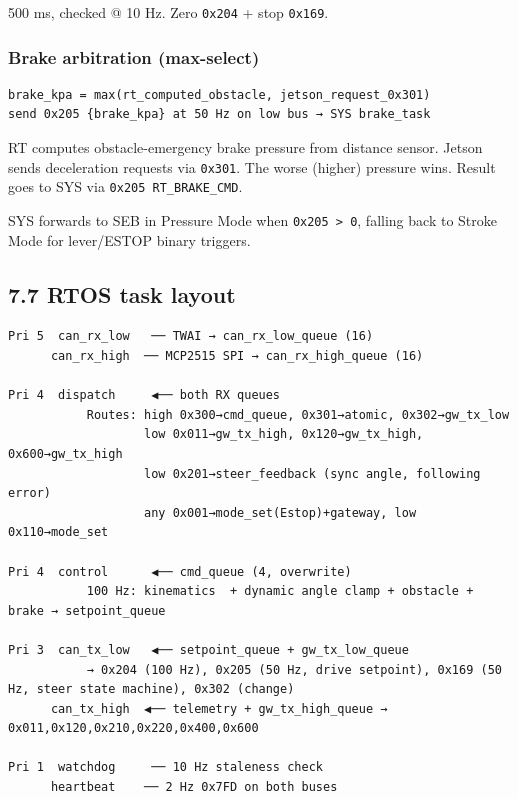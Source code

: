 \documentclass[12pt,a4paper,oneside]{report}
\begin{document}
500 ms, checked @ 10 Hz. Zero \texttt{0x204} + stop \texttt{0x169}.

\subsubsection{Brake arbitration
(max-select)}\label{brake-arbitration-max-select}

\begin{verbatim}
brake_kpa = max(rt_computed_obstacle, jetson_request_0x301)
send 0x205 {brake_kpa} at 50 Hz on low bus → SYS brake_task
\end{verbatim}

RT computes obstacle-emergency brake pressure from distance sensor. Jetson sends
deceleration requests via \texttt{0x301}. The worse (higher) pressure wins.
Result goes to SYS via \texttt{0x205\ RT\_BRAKE\_CMD}.

SYS forwards to SEB in Pressure Mode when \texttt{0x205\ \textgreater{}\ 0},
falling back to Stroke Mode for lever/ESTOP binary triggers.

\subsection{7.7 RTOS task layout}\label{rtos-task-layout}

\begin{verbatim}
Pri 5  can_rx_low   ── TWAI → can_rx_low_queue (16)
      can_rx_high  ── MCP2515 SPI → can_rx_high_queue (16)

Pri 4  dispatch     ◀── both RX queues
           Routes: high 0x300→cmd_queue, 0x301→atomic, 0x302→gw_tx_low
                   low 0x011→gw_tx_high, 0x120→gw_tx_high, 0x600→gw_tx_high
                   low 0x201→steer_feedback (sync angle, following error)
                   any 0x001→mode_set(Estop)+gateway, low 0x110→mode_set

Pri 4  control      ◀── cmd_queue (4, overwrite)
           100 Hz: kinematics  + dynamic angle clamp + obstacle + brake → setpoint_queue

Pri 3  can_tx_low   ◀── setpoint_queue + gw_tx_low_queue
           → 0x204 (100 Hz), 0x205 (50 Hz, drive setpoint), 0x169 (50 Hz, steer state machine), 0x302 (change)
      can_tx_high  ◀── telemetry + gw_tx_high_queue → 0x011,0x120,0x210,0x220,0x400,0x600

Pri 1  watchdog     ── 10 Hz staleness check
      heartbeat    ── 2 Hz 0x7FD on both buses
\end{verbatim}
\end{document}
